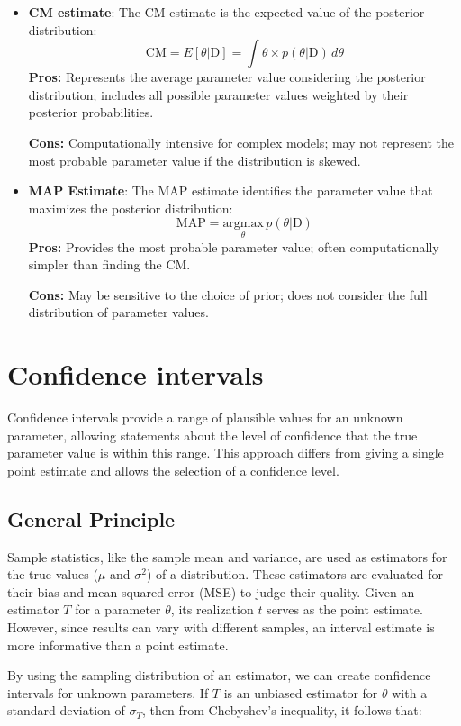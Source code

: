 \documentclass{article}
\begin{document}
\begin{itemize}
    \item \textbf{CM estimate}: The CM estimate is the expected value of the posterior distribution:
\[
\text{CM} = E[\theta | \text{D}] = \int \theta \times p(\theta | \text{D}) \, d\theta
\]
\textbf{Pros:} Represents the average parameter value considering the posterior distribution; includes all possible parameter values weighted by their posterior probabilities.

\textbf{Cons:} Computationally intensive for complex models; may not represent the most probable parameter value if the distribution is skewed.

    \item \textbf{MAP Estimate}: The MAP estimate identifies the parameter value that maximizes the posterior distribution:
\[
\text{MAP} = \underset{\theta}{\text{argmax}} \, p(\theta | \text{D})
\]
\textbf{Pros:} Provides the most probable parameter value; often computationally simpler than finding the CM.

\textbf{Cons:} May be sensitive to the choice of prior; does not consider the full distribution of parameter values.

\end{itemize}

\section{Confidence intervals}

Confidence intervals provide a range of plausible values for an unknown parameter, allowing statements about the level of confidence that the true parameter value is within this range. This approach differs from giving a single point estimate and allows the selection of a confidence level.

\subsection{General Principle}
Sample statistics, like the sample mean and variance, are used as estimators for the true values ($\mu$ and $\sigma^2$) of a distribution. These estimators are evaluated for their bias and mean squared error (MSE) to judge their quality. Given an estimator $T$ for a parameter $\theta$, its realization $t$ serves as the point estimate. However, since results can vary with different samples, an interval estimate is more informative than a point estimate.

By using the sampling distribution of an estimator, we can create confidence intervals for unknown parameters. If $T$ is an unbiased estimator for $\theta$ with a standard deviation of $\sigma_T$, then from Chebyshev's inequality, it follows that:
\end{document}
